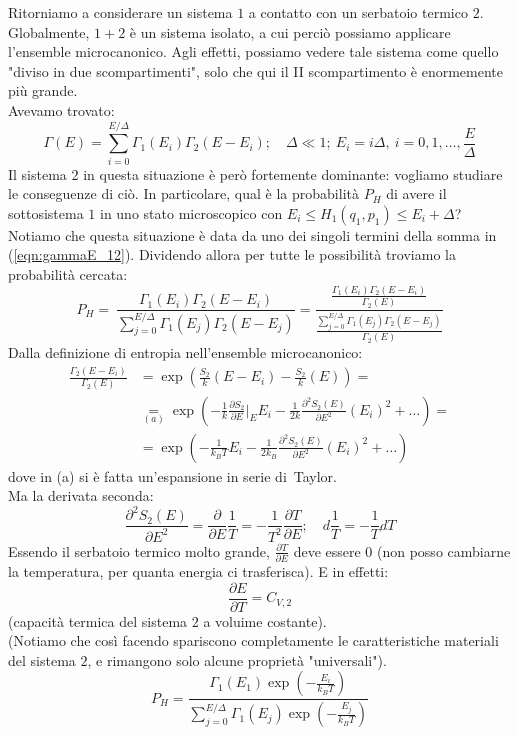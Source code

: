 \documentclass[12pt]{article}
\begin{document}
Ritorniamo a considerare un sistema $1$ a contatto con un serbatoio termico $2$. Globalmente, $1+2$ è un sistema isolato, a cui perciò possiamo applicare l'ensemble microcanonico. Agli effetti, possiamo vedere tale sistema come quello "diviso in due scompartimenti", solo che qui il II scompartimento è enormemente più grande.\\
Avevamo trovato:
\begin{equation}
\Gamma(E)=\sum_{i=0}^{E/\Delta}\Gamma_1(E_i)\Gamma_2(E-E_i); \quad \Delta \ll 1; \>E_i=i\Delta,\>i=0,1,\dots,\frac{E}{\Delta}
\label{eqn:gammaE_12}
\end{equation}
Il sistema $2$ in questa situazione è però fortemente dominante: vogliamo studiare le conseguenze di ciò. In particolare, qual è la probabilità $P_H$ di avere il sottosistema $1$ in uno stato microscopico con $E_i\leq H_1(q_1, p_1)\leq E_i+\Delta$? Notiamo che questa situazione è data da uno dei singoli termini della somma in (\ref{eqn:gammaE_12}). Dividendo allora per tutte le possibilità troviamo la probabilità cercata:
\[
P_H =\ \frac{\displaystyle \Gamma_1(E_i)\Gamma_2(E-E_i)}{\displaystyle \sum_{j=0}^{E/\Delta}\Gamma_1(E_j)\Gamma_2(E-E_j)
}
=
\frac{\displaystyle
\frac{\Gamma_1(E_i)\Gamma_2(E-E_i)}{\Gamma_2(E)}
}{
\displaystyle
\frac{\displaystyle \sum_{j=0}^{E/\Delta} \Gamma_1(E_j)\Gamma_2(E-E_j)}{\Gamma_2(E)}
}
\]
Dalla definizione di entropia nell'ensemble microcanonico:
\begin{align*}
\frac{\Gamma_2(E-E_i)}{\Gamma_2(E)}&=\exp\left(
\frac{S_2}{k}(E-E_i)-\frac{S_2}{k}(E)
\right) =\\
&\underset{(a)}{=} 
\exp\left(-\frac{1}{k}\frac{\partial S_2}{\partial E}\big|_E E_i -\frac{1}{2k}\frac{\partial^2 S_2(E)}{\partial E^2}(E_i)^2+\dots \right) =\\
&= \exp\left(-\frac{1}{k_B T}E_i - \frac{1}{2k_B}\frac{\partial^2 S_2(E)}{\partial E^2}(E_i)^2+\dots\right)
\end{align*}
dove in (a) si è fatta un'espansione in serie di\ Taylor.\\
Ma la derivata seconda:
\[
\frac{\partial^2 S_2(E)}{\partial E^2}=\frac{\partial}{\partial E}\frac{1}{T}=-\frac{1}{T^2}\frac{\partial T}{\partial E}; \quad d\frac{1}{T}=-\frac{1}{T}dT
\]
Essendo il serbatoio termico molto grande, $\frac{\partial T}{\partial E}$ deve essere $0$ (non posso cambiarne la temperatura, per quanta energia ci trasferisca). E in effetti:
\[
\frac{\partial E}{\partial T}=C_{V,2}
\]
(capacità termica del sistema $2$ a voluime costante).\\
(Notiamo che così facendo spariscono completamente le caratteristiche materiali del sistema $2$, e rimangono solo alcune proprietà "universali").\\
\[
P_H = \frac{\displaystyle \Gamma_1(E_1) \exp\left(-\frac{E_i}{k_B T}\right )}{\displaystyle \sum_{j=0}^{E/\Delta} \Gamma_1(E_j) \exp\left(-\frac{E_j}{k_B T}\right)}
\]
\end{document}
